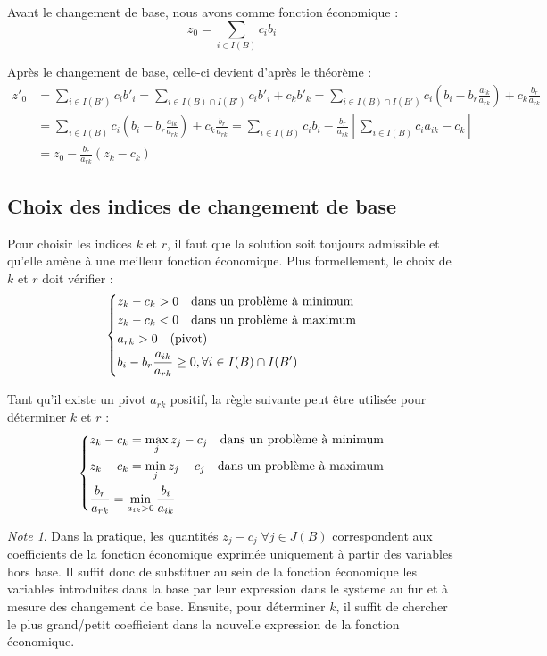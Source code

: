 \documentclass[a4paper]{report}
\theoremstyle{definition}
\theoremstyle{remark}
\newtheorem*{note}{Note}
\theoremstyle{plain}
\begin{document}
Avant le changement de base, nous avons comme fonction économique :
\[ z_0 = \sum_{i \in I(B)}{c_i b_i} \]

Après le changement de base, celle-ci devient d'après le théorème :
\begin{equation*}\begin{split}
z'_0 & = \sum_{i \in I(B')}{c_i b'_i} = \sum_{i \in I(B) \cap I(B')}{c_i b'_i} + c_k b'_k = \sum_{i \in I(B) \cap I(B')}{c_i \left( b_i - b_r \frac{a_{ik}}{a_{rk}} \right)} + c_k \frac{b_r}{a_{rk}} \\
& = \sum_{i \in I(B)}{c_i \left( b_i - b_r \frac{a_{ik}}{a_{rk}} \right)} + c_k \frac{b_r}{a_{rk}} = \sum_{i \in I(B)}{c_i b_i} - \frac{b_r}{a_{rk}} \left[ \sum_{i \in I(B)}{c_i a_{ik} - c_k} \right] \\
& = z_0 - \frac{b_r}{a_{rk}} (z_k - c_k)
\end{split}\end{equation*}

\subsection{Choix des indices de changement de base}
Pour choisir les indices \(k\) et \(r\), il faut que la solution soit toujours
admissible et qu'elle amène à une meilleur fonction économique. Plus
formellement, le choix de $k$ et $r$ doit vérifier :
\[\begin{dcases}
	z_k - c_k > 0 \quad \text{dans un problème à minimum} \\
    z_k - c_k < 0 \quad \text{dans un problème à maximum} \\
    a_{rk} > 0 \quad \text{(pivot)} \\
    b_i - b_r \frac{a_{ik}}{a_{rk}} \geq 0, \forall i \in I(B) \cap I(B')
\end{dcases}\]

Tant qu'il existe un pivot $a_{rk}$ positif, la règle suivante peut être utilisée pour déterminer $k$ et $r$ :
\[\begin{dcases}
	z_k - c_k = \max_{j}{z_j - c_j} \quad \text{dans un problème à minimum} \\
    z_k - c_k = \min_{j}{z_j - c_j} \quad \text{dans un problème à maximum} \\
    \frac{b_r}{a_{rk}} = \min_{a_{ik}>0}{\frac{b_i}{a_{ik}}}
\end{dcases}\]

\begin{note}
Dans la pratique, les quantités \(z_j - c_j\;\forall j\in J(B)\) correspondent
aux coefficients de la fonction économique exprimée uniquement à partir des
variables hors base. Il suffit donc de substituer au sein de la fonction
économique les variables introduites dans la base par leur expression dans le
systeme au fur et à mesure des changement de base. Ensuite, pour déterminer
\(k\), il suffit de chercher le plus grand/petit coefficient dans la nouvelle
expression de la fonction économique.
\end{note}
\end{document}
